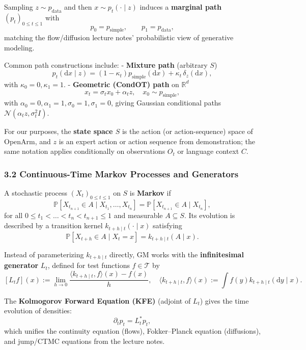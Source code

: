 \documentclass[
]{article}
\theoremstyle{remark}
\begin{document}
Sampling \(z \sim p_{\text{data}}\) and then \(x \sim p_t(\cdot\mid z)\)
induces a \textbf{marginal path} \((p_t)_{0 \le t \le 1}\) with \[
 p_0 = p_{\text{simple}}, \qquad p_1 = p_{\text{data}},
\] matching the flow/diffusion lecture notes' probabilistic view of
generative modeling. \cite{lecnotes2026,gm-companion-notes}

Common path constructions include: \cite{gm2025,gm-companion-notes} -
\textbf{Mixture path} (arbitrary \(S\)) \[
  p_t(\mathrm{d}x \mid z) = (1 - \kappa_t) p_{\text{simple}}(\mathrm{d}x) + \kappa_t \, \delta_z(\mathrm{d}x),
  \] with \(\kappa_0 = 0, \kappa_1 = 1\). - \textbf{Geometric (CondOT)
path} on \(\mathbb{R}^d\) \[
  x_t = \sigma_t x_0 + \alpha_t z, \quad x_0 \sim p_{\text{simple}},
  \] with \(\alpha_0 = 0, \alpha_1 = 1, \sigma_0 = 1, \sigma_1 = 0\),
giving Gaussian conditional paths
\(\mathcal{N}(\alpha_t z, \sigma_t^2 I)\). \cite{gm-companion-notes}

For our purposes, the \textbf{state space \(S\)} is the action (or
action-sequence) space of OpenArm, and \(z\) is an expert action or
action sequence from demonstration; the same notation applies
conditionally on observations \(O_t\) or language context
\(C\). \cite{diffusion-policy2023,diffpolicy-theory-notes}

\subsubsection{3.2 Continuous-Time Markov Processes and
Generators}\label{continuous-time-markov-processes-and-generators}

A stochastic process \((X_t)_{0 \le t \le 1}\) on \(S\) is
\textbf{Markov} if \[
\mathbb{P}[X_{t_{n+1}} \in A \mid X_{t_1},\dots,X_{t_n}] = \mathbb{P}[X_{t_{n+1}} \in A \mid X_{t_n}],
\] for all \(0 \le t_1 < \dots < t_n < t_{n+1} \le 1\) and measurable
\(A \subseteq S\). Its evolution is described by a transition kernel
\(k_{t+h\mid t}(\cdot \mid x)\) satisfying \cite{gm2025,gm-companion-notes} \[
\mathbb{P}[X_{t+h} \in A \mid X_t = x] = k_{t+h\mid t}(A \mid x).
\]

Instead of parameterizing \(k_{t+h\mid t}\) directly, GM works with the
\textbf{infinitesimal generator} \(L_t\), defined for test functions
\(f \in \mathcal{T}\) by \[
[L_t f](x) := \lim_{h \to 0} \frac{\langle k_{t+h\mid t}, f \rangle(x) - f(x)}{h}, \quad \langle k_{t+h\mid t}, f \rangle(x) := \int f(y) k_{t+h\mid t}(\mathrm{d}y \mid x).
\]\cite{gm-companion-notes,gm2025}

The \textbf{Kolmogorov Forward Equation (KFE)} (adjoint of \(L_t\))
gives the time evolution of densities: \[
\partial_t p_t = L_t^* p_t,
\] which unifies the continuity equation (flows), Fokker--Planck
equation (diffusions), and jump/CTMC equations from the lecture
notes. \cite{lecnotes2026,gm-companion-notes,gm2025}
\end{document}
